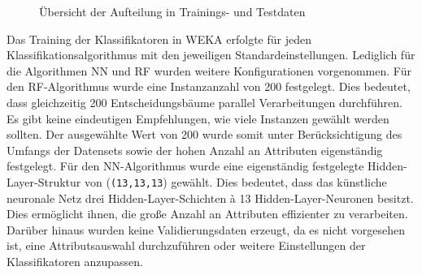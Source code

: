 \begin{figure}[ht]
  \qquad
  \qquad
  \caption{Übersicht der Aufteilung in Trainings- und Testdaten\label{fig:splits}}
\end{figure}

Das Training der Klassifikatoren in WEKA erfolgte für jeden Klassifikationsalgorithmus mit den jeweiligen Standardeinstellungen. Lediglich für die Algorithmen NN und RF wurden weitere Konfigurationen vorgenommen. Für den RF-Algorithmus wurde eine Instanzanzahl von 200 festgelegt. Dies bedeutet, dass gleichzeitig 200 Entscheidungsbäume parallel Verarbeitungen durchführen. Es gibt keine eindeutigen Empfehlungen, wie viele Instanzen gewählt werden sollten. Der ausgewählte Wert von 200 wurde somit unter Berücksichtigung des Umfangs der Datensets sowie der hohen Anzahl an Attributen eigenständig festgelegt. Für den NN-Algorithmus wurde eine eigenständig festgelegte Hidden-Layer-Struktur von (\texttt{(13,13,13}) gewählt. Dies bedeutet, dass das künstliche neuronale Netz drei Hidden-Layer-Schichten à 13 Hidden-Layer-Neuronen besitzt. Dies ermöglicht ihnen, die große Anzahl an Attributen effizienter zu verarbeiten. Darüber hinaus wurden keine Validierungsdaten erzeugt, da es nicht vorgesehen ist, eine Attributsauswahl durchzuführen oder weitere Einstellungen der Klassifikatoren anzupassen.


